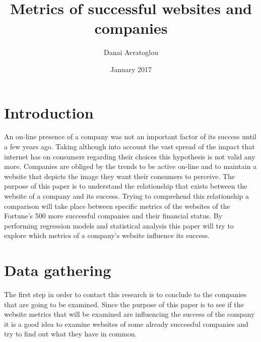 \documentclass{article}
\begin{document}
\title{Metrics of successful websites and companies}
\author{Danai Avratoglou}
\date{January 2017}
\maketitle
\newpage
\tableofcontents
\newpage
\section{Introduction}
 
An on-line presence of a company was not an important factor of its success until a few years ago. Taking although into account the vast spread of the impact that internet has on consumers regarding their choices this hypothesis is not valid any more. Companies are obliged by the trends to be active on-line and to maintain a website that depicts the image they want their consumers to perceive. The purpose of this paper is to understand the relationship that exists between the website of a company and its success. Trying to comprehend this relationship a comparison will take place between specific metrics of the websites of the Fortune's 500 more successful companies  and their financial status. By performing regression models and statistical analysis this paper will try to explore which metrics of a company's website influence its success.   
\newpage
\section{Data gathering}
The first step in order to contact this research is to conclude to the companies that are going to be examined. Since the purpose of this paper is to see if the website metrics that will be examined are influencing the success of the company it is a good idea to examine websites of some already successful companies and try to find out what they have in common.
\end{document}
